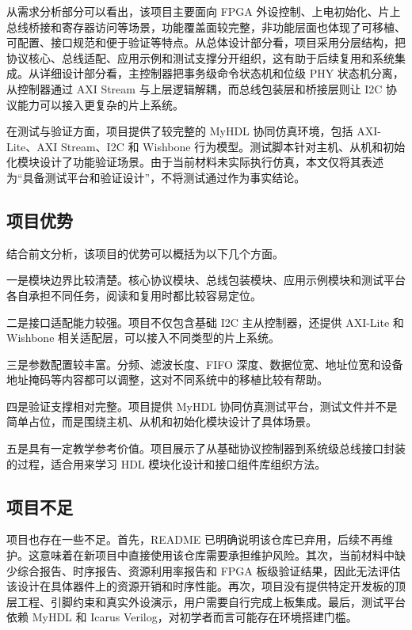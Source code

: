 \documentclass[12pt,a4paper]{article}
\numberwithin{equation}{section}
\begin{document}
从需求分析部分可以看出，该项目主要面向 FPGA 外设控制、上电初始化、片上总线桥接和寄存器访问等场景，功能覆盖面较完整，非功能层面也体现了可移植、可配置、接口规范和便于验证等特点。从总体设计部分看，项目采用分层结构，把协议核心、总线适配、应用示例和测试支撑分开组织，这有助于后续复用和系统集成。从详细设计部分看，主控制器把事务级命令状态机和位级 PHY 状态机分离，从控制器通过 AXI Stream 与上层逻辑解耦，而总线包装层和桥接层则让 I2C 协议能力可以接入更复杂的片上系统。

在测试与验证方面，项目提供了较完整的 MyHDL 协同仿真环境，包括 AXI-Lite、AXI Stream、I2C 和 Wishbone 行为模型。测试脚本针对主机、从机和初始化模块设计了功能验证场景。由于当前材料未实际执行仿真，本文仅将其表述为“具备测试平台和验证设计”，不将测试通过作为事实结论。

\subsection{项目优势}

结合前文分析，该项目的优势可以概括为以下几个方面。

一是模块边界比较清楚。核心协议模块、总线包装模块、应用示例模块和测试平台各自承担不同任务，阅读和复用时都比较容易定位。

二是接口适配能力较强。项目不仅包含基础 I2C 主从控制器，还提供 AXI-Lite 和 Wishbone 相关适配层，可以接入不同类型的片上系统。

三是参数配置较丰富。分频、滤波长度、FIFO 深度、数据位宽、地址位宽和设备地址掩码等内容都可以调整，这对不同系统中的移植比较有帮助。

四是验证支撑相对完整。项目提供 MyHDL 协同仿真测试平台，测试文件并不是简单占位，而是围绕主机、从机和初始化模块设计了具体场景。

五是具有一定教学参考价值。项目展示了从基础协议控制器到系统级总线接口封装的过程，适合用来学习 HDL 模块化设计和接口组件库组织方法。

\subsection{项目不足}

项目也存在一些不足。首先，README 已明确说明该仓库已弃用，后续不再维护。这意味着在新项目中直接使用该仓库需要承担维护风险。其次，当前材料中缺少综合报告、时序报告、资源利用率报告和 FPGA 板级验证结果，因此无法评估该设计在具体器件上的资源开销和时序性能。再次，项目没有提供特定开发板的顶层工程、引脚约束和真实外设演示，用户需要自行完成上板集成。最后，测试平台依赖 MyHDL 和 Icarus Verilog，对初学者而言可能存在环境搭建门槛。
\end{document}

